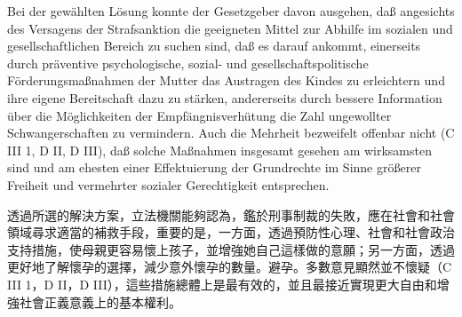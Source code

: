 \documentclass[12pt]{article}
\begin{document}
\syncleft
\begin{sourcepara}
Bei der gewählten Lösung konnte der Gesetzgeber davon ausgehen, daß angesichts des Versagens der Strafsanktion die geeigneten Mittel zur Abhilfe im sozialen und gesellschaftlichen Bereich zu suchen sind, daß es darauf ankommt, einerseits durch präventive psychologische, sozial- und gesellschaftspolitische Förderungsmaßnahmen der Mutter das Austragen des Kindes zu erleichtern und ihre eigene Bereitschaft dazu zu stärken, andererseits durch bessere Information über die Möglichkeiten der Empfängnisverhütung die Zahl ungewollter Schwangerschaften zu vermindern. Auch die Mehrheit bezweifelt offenbar nicht (C III 1, D II, D III), daß solche Maßnahmen insgesamt gesehen am wirksamsten sind und am ehesten einer Effektuierung der Grundrechte im Sinne größerer Freiheit und vermehrter sozialer Gerechtigkeit entsprechen.
\end{sourcepara}
\begin{transpara}
透過所選的解決方案，立法機關能夠認為，鑑於刑事制裁的失敗，應在社會和社會領域尋求適當的補救手段，重要的是，一方面，透過預防性心理、社會和社會政治支持措施，使母親更容易懷上孩子，並增強她自己這樣做的意願；另一方面，透過更好地了解懷孕的選擇，減少意外懷孕的數量。避孕。多數意見顯然並不懷疑（C III 1，D II，D III），這些措施總體上是最有效的，並且最接近實現更大自由和增強社會正義意義上的基本權利。
\end{transpara}
\end{document}
